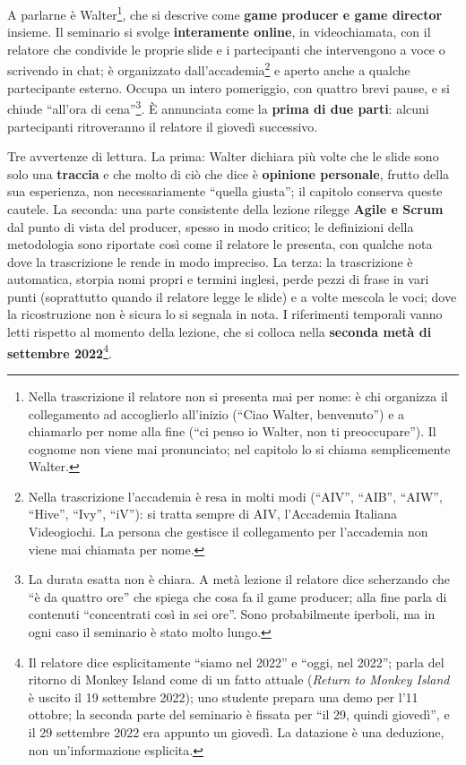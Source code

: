 A parlarne è Walter\footnote{Nella trascrizione il relatore non si presenta
mai per nome: è chi organizza il collegamento ad accoglierlo all'inizio
(``Ciao Walter, benvenuto'') e a chiamarlo per nome alla fine (``ci penso io
Walter, non ti preoccupare''). Il cognome non viene mai pronunciato; nel
capitolo lo si chiama semplicemente Walter.}, che si descrive come
\textbf{game producer e game director} insieme. Il seminario si svolge
\textbf{interamente online}, in videochiamata, con il relatore che condivide le
proprie slide e i partecipanti che intervengono a voce o scrivendo in chat; è
organizzato dall'accademia\footnote{Nella trascrizione l'accademia è resa in
molti modi (``AIV'', ``AIB'', ``AIW'', ``Hive'', ``Ivy'', ``iV''): si tratta
sempre di AIV, l'Accademia Italiana Videogiochi. La persona che gestisce il
collegamento per l'accademia non viene mai chiamata per nome.} e aperto anche a
qualche partecipante esterno. Occupa un intero pomeriggio, con quattro brevi pause, e si
chiude ``all'ora di cena''\footnote{La durata esatta non è chiara. A metà
lezione il relatore dice scherzando che ``è da quattro ore'' che spiega che
cosa fa il game producer; alla fine parla di contenuti ``concentrati così in sei
ore''. Sono probabilmente iperboli, ma in ogni caso il seminario è stato molto
lungo.}. È annunciata come la \textbf{prima di due parti}: alcuni partecipanti
ritroveranno il relatore il giovedì successivo.

Tre avvertenze di lettura. La prima: Walter dichiara più volte che le slide sono
solo una \textbf{traccia} e che molto di ciò che dice è \textbf{opinione
personale}, frutto della sua esperienza, non necessariamente ``quella giusta'';
il capitolo conserva queste cautele. La seconda: una parte consistente della
lezione rilegge \textbf{Agile e Scrum} dal punto di vista del producer, spesso in
modo critico; le definizioni della metodologia sono riportate così come il
relatore le presenta, con qualche nota dove la trascrizione le rende in modo
impreciso. La terza: la trascrizione è automatica, storpia nomi propri e termini
inglesi, perde pezzi di frase in vari punti (soprattutto quando il relatore
legge le slide) e a volte mescola le voci; dove la ricostruzione non è sicura lo
si segnala in nota. I riferimenti temporali vanno letti rispetto al momento
della lezione, che si colloca nella \textbf{seconda metà di settembre
2022}\footnote{Il relatore dice esplicitamente ``siamo nel 2022'' e ``oggi, nel
2022''; parla del ritorno di Monkey Island come di un fatto attuale
(\emph{Return to Monkey Island} è uscito il 19 settembre 2022); uno studente
prepara una demo per l'11 ottobre; la seconda parte del seminario è fissata per
``il 29, quindi giovedì'', e il 29 settembre 2022 era appunto un giovedì. La
datazione è una deduzione, non un'informazione esplicita.}.

